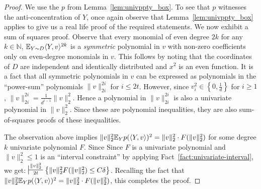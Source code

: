 \begin{proof} 
We use the $p$ from Lemma~\ref{lem:univppty_box}. To see that $p$ witnesses the anti-concentration of $Y$, once again observe that Lemma~\ref{lem:univppty_box} applies to give us a real life proof of the required statements. We now exhibit a sum of squares proof. Observe that every monomial of even degree $2k$ for any $k \in \mathbb{N}$, $\mathbb{E}_{Y \sim D} \langle Y,v\rangle^{2k}$ is a \emph{symmetric} polynomial in $v$ with non-zero coefficients only on even-degree monomials in $v$. This follows by noting that the coordinates of $D$ are independent and identically distributed and $x^2$ is an even function. It is a fact that all symmetric polynomials in $v$ can be expressed as polynomials in the ``power-sum'' polynomials $\|v\|_{2i}^{2i}$ for $i \leq 2t$. However, since $v_i^2 \in \left \{0,  \frac{1}{d} \right \}$ for $i \geq 1$, $\|v\|_{2i}^{2i} = \frac{1}{d^{i-1}} \|v\|_2^2 $. Hence a polynomial in $\|v\|_{2i}^{2i}$ is also a univariate polynomial in $\|v\|_2^2$. Since these are polynomial inequalities, they are also sum-of-squares proofs of these inequalities. 

The observation above implies $ \|v\|_2^2 \mathbb{E}_{Y} p(\langle Y, v \rangle)^2 = \|v\|_2^2 \cdot F(\|v\|_2^2)$ for some degree $k$ univariate polynomial $F$. Since  Since $F$ is a univariate polynomial and $\|v\|_2^2\leq 1$ is an ``interval constraint'' by applying Fact~\ref{fact:univariate-interval}, we get:
$\sststile{2t}{\|v\|_2^2} \Set{\|v\|_2^2 F(\|v\|_2^2) \leq C \delta}$.
Recalling the fact that $ \|v\|_2^2 \mathbb{E}_{Y} p(\langle Y, v \rangle)^2 = \|v\|_2^2 \cdot F(\|v\|_2^2)$, this completes the proof. 
\end{proof}





